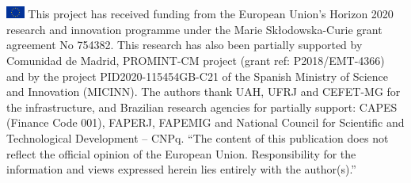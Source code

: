 \documentclass[runningheads]{llncs}
\begin{document}
\noindent \includegraphics[width=0.6cm]{bandeira.png} This project has received funding from the European Union’s Horizon 2020 research and innovation programme under the Marie Skłodowska-Curie grant agreement No 754382. This research has also been partially supported by Comunidad de Madrid, PROMINT-CM project (grant ref: P2018/EMT-4366) and by the project PID2020-115454GB-C21 of the Spanish Ministry of Science and Innovation (MICINN). The authors thank UAH, UFRJ and CEFET-MG for the infrastructure, and Brazilian research agencies for partially support: CAPES (Finance Code 001), FAPERJ, FAPEMIG and National Council for Scientific and Technological Development – CNPq. ``The content of this publication does not reflect the official opinion of the European Union. Responsibility for the information and views expressed herein lies entirely with the author(s).''


\FloatBarrier


%

%
%
%


%
\end{document}
